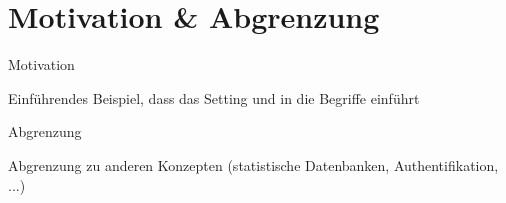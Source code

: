 \section{Motivation \& Abgrenzung}

\begin{frame}{Motivation}

Einführendes Beispiel, dass das Setting und in die Begriffe einführt

\end{frame}


\begin{frame}{Abgrenzung}

Abgrenzung zu anderen Konzepten (statistische Datenbanken, Authentifikation, ...)

\end{frame}
